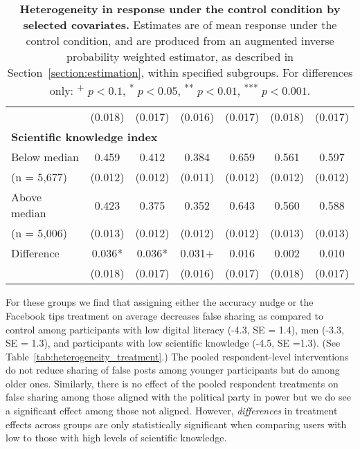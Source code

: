 \documentclass[letterpaper, 12pt, parskip=full,DIV=10]{scrartcl}
\begin{document}
\begin{table}[H]
{\begin{tabular}{lcccccc}
 & (\num{0.018}) & (\num{0.017}) & (\num{0.016}) & (\num{0.017}) & (\num{0.018}) & (\num{0.017})\\
\multicolumn{4}{l}{\textbf{Scientific knowledge index}} \rule{0pt}{1.2\normalbaselineskip} \\
\hspace{1em} Below median & \num{0.459} & \num{0.412} & \num{0.384} & \num{0.659} & \num{0.561} & \num{0.597}\\
 \hspace{1.5em}   (n = 5,677) & (\num{0.012}) & (\num{0.012}) & (\num{0.011}) & (\num{0.012}) & (\num{0.012}) & (\num{0.012})\\
 \hspace{1em} Above median& \num{0.423} & \num{0.375} & \num{0.352} & \num{0.643} & \num{0.560} & \num{0.588}\\
 \hspace{1.5em}  (n = 5,006)  & (\num{0.013}) & (\num{0.012}) & (\num{0.012}) & (\num{0.012}) & (\num{0.013}) & (\num{0.013})\\\cmidrule(lr){2-7}
\hspace{1em} Difference  & \num{0.036}* & \num{0.036}* & \num{0.031}+ & \num{0.016} & \num{0.002} & \num{0.010}\\
 & (\num{0.018}) & (\num{0.017}) & (\num{0.016}) & (\num{0.017}) & (\num{0.018}) & (\num{0.017})\\
   \end{tabular}}
   \caption{\textbf{Heterogeneity in response under the control condition by selected covariates.} Estimates are of mean response under the control condition, and are produced from an augmented inverse probability weighted estimator, as described in Section~\ref{section:estimation}, within specified subgroups. For differences only: \textsuperscript{+} $p<0.1$, \textsuperscript{*} $p < 0.05$, \textsuperscript{**} $p < 0.01$, \textsuperscript{***} $p < 0.001$.}   
   \label{tab:heterogeneity_control}
\end{table}


For these groups we find that assigning either the accuracy nudge or the Facebook tips treatment on average decreases false sharing as compared to control among participants with low digital literacy (-4.3, SE = 1.4), men (-3.3, SE = 1.3), and participants with low scientific knowledge (-4.5, SE =1.3). (See Table~\ref{tab:heterogeneity_treatment}.) The pooled respondent-level interventions do not reduce sharing of false posts among younger participants but do among older ones. Similarly, there is no effect of the pooled respondent treatments on false sharing among those aligned with the political party in power but we do see a significant effect among those not aligned. However, \textit{differences} in treatment effects across groups are only statistically significant when comparing users with low to those with high levels of scientific knowledge.
\end{document}
